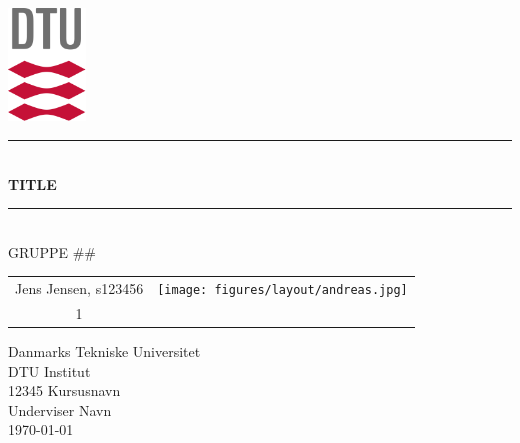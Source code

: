 \begin{titlepage}
\flushright\includegraphics[height=3cm]{figures/layout/dtulogo.png}
\begin{center} \parindent=0pt
\newcommand{\HRule}{\rule{\textwidth}{1mm}}
\HRule\\[1cm]\Huge\bfseries
TITLE\\[0.7cm]
\HRule\\[1cm]
\large GRUPPE ##\\[0.7cm]
\begin{table}[H]
    \centering
    \begin{tabular}{c >{\centering\arraybackslash}m{}}
        \large Jens Jensen, s123456  &  \texttt{[image: figures/layout/andreas.jpg]}\\1
        \end{tabular}
\end{table}
 \normalsize %
\begin{flushleft}
Danmarks Tekniske Universitet\\
DTU Institut\\
12345 Kursusnavn \\
Underviser Navn \\
\today
\end{flushleft}
\end{center}
\end{titlepage}
